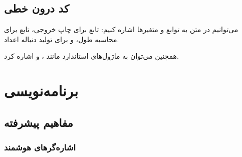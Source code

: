 \documentclass{matinbook}
\begin{document}
    \section{کد درون خطی}
    
    می‌توانیم در متن به توابع و متغیرها اشاره کنیم:
    تابع  برای چاپ خروجی،
    تابع  برای محاسبه طول،
    و  برای تولید دنباله اعداد.
    
    همچنین می‌توان به ماژول‌های استاندارد مانند
    ، 
    و  اشاره کرد.
    
    \chapter{برنامه‌نویسی }
    
    \section{مفاهیم پیشرفته}
    
    \subsection{اشاره‌گرهای هوشمند}
    
\end{document}
